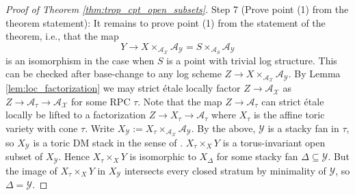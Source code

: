 \documentclass[11pt]{amsart}
\theoremstyle{definition}
\theoremstyle{remark}
\begin{document}
\begin{proof}[Proof of Theorem \ref{thm:trop_cpt_open_subsets}]
	Step 7 (Prove point (1) from the theorem statement): It remains to prove point (1) from the statement of the theorem, i.e.,
	that the map
	$$Y\to X\times_{\mathcal{A}_{\mathcal{X}}}\mathcal{A}_{\mathcal{Y}}=S\times_{\mathcal{A}_{S}}\mathcal{A}_{\mathcal{Y}}$$
	is an isomorphism in the case when $S$ is a point with trivial log structure.
	This can be checked after base-change to any
	log scheme $Z\to X\times_{\mathcal{A}_{\mathcal{X}}}\mathcal{A}_{\mathcal{Y}}$.
	By Lemma \ref{lem:loc_factorization} we may strict étale locally factor $Z\to \mathcal{A}_{\mathcal{X}}$ as
	$Z\to \mathcal{A}_{\tau}\to \mathcal{A}_{\mathcal{X}}$ for some RPC $\tau$.
	Note that the map $Z\to \mathcal{A}_{\tau}$ can strict étale locally be lifted to a factorization $Z\to X_{\tau}\to \mathcal{A}_{\tau}$
	where $X_{\tau}$ is the affine toric variety with cone $\tau$.
	Write $X_{\mathcal{Y}}:=X_{\tau}\times_{\mathcal{A}_{\mathcal{X}}}\mathcal{A}_{\mathcal{Y}}$. By the above, $\mathcal{Y}$
	is a stacky fan in $\tau$, so $X_{\mathcal{Y}}$ is a toric DM stack in the sense of \cite{ATheoryOfStaGillam2015}.
	$X_{\tau}\times_{X}Y$ is a torus-invariant open subset of $X_{\mathcal{Y}}$. Hence $X_{\tau}\times_{X}Y$
	is isomorphic to $X_{\Delta}$ for some stacky fan $\Delta\subseteq \mathcal{Y}$. But the image
	of $X_{\tau}\times_{X}Y$ in $X_{\mathcal{Y}}$ intersects every closed stratum by minimality of $\mathcal{Y}$, so $\Delta=\mathcal{Y}$.
\end{proof}
\end{document}
